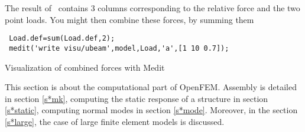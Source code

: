 The result of \feload\ contains 3 columns corresponding to the relative force and the two point loads.
You might then combine these forces, by summing them

\begin{verbatim}
 Load.def=sum(Load.def,2);
 medit('write visu/ubeam',model,Load,'a',[1 10 0.7]);
\end{verbatim}

\begin{center}
\begin{figure}[H]
\centering
{} %
\end{figure}

Visualization of combined forces with Medit
\end{center}


\newpage

This section is about the computational part of OpenFEM. Assembly is detailed in section \ref{s*mk}, computing the static response of a structure in section \ref{s*static}, computing normal modes in section \ref{s*mode}. Moreover, in the section \ref{s*large}, the case of large finite element models is discussed. 

